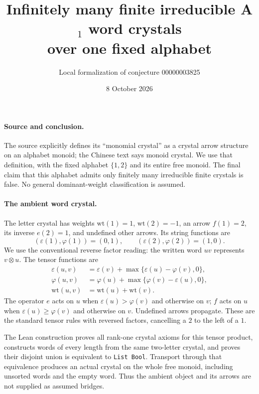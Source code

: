 \documentclass[11pt]{article}
\title{Infinitely many finite irreducible A\texorpdfstring{$_1$}{1} word crystals\\over one fixed alphabet}
\author{Local formalization of conjecture 00000003825}
\date{8 October 2026}
\begin{document}
\maketitle
\vspace{-12mm}
\paragraph{Source and conclusion.}
The source explicitly defines its ``monomial crystal'' as a crystal arrow structure on an alphabet monoid; the Chinese text says monoid crystal. We use that definition, with the fixed alphabet $\{1,2\}$ and its entire free monoid. The final claim that this alphabet admits only finitely many irreducible finite crystals is false. No general dominant-weight classification is assumed.

\paragraph{The ambient word crystal.}
The letter crystal has weights $\mathrm{wt}(1)=1$, $\mathrm{wt}(2)=-1$, an arrow $f(1)=2$, its inverse $e(2)=1$, and undefined other arrows. Its string functions are
\[
(\varepsilon(1),\varphi(1))=(0,1),\qquad
(\varepsilon(2),\varphi(2))=(1,0).
\]
We use the conventional reverse factor reading: the written word $uv$ represents $v\otimes u$. The tensor functions are
\begin{align*}
\varepsilon(u,v)&=\varepsilon(v)+\max\{\varepsilon(u)-\varphi(v),0\},\\
\varphi(u,v)&=\varphi(u)+\max\{\varphi(v)-\varepsilon(u),0\},\\
\mathrm{wt}(u,v)&=\mathrm{wt}(u)+\mathrm{wt}(v).
\end{align*}
The operator $e$ acts on $u$ when $\varepsilon(u)>\varphi(v)$ and otherwise on $v$; $f$ acts on $u$ when $\varepsilon(u)\geq\varphi(v)$ and otherwise on $v$. Undefined arrows propagate. These are the standard tensor rules with reversed factors, cancelling a $2$ to the left of a $1$.

The Lean construction proves all rank-one crystal axioms for this tensor product, constructs words of every length from the same two-letter crystal, and proves their disjoint union is equivalent to \texttt{List Bool}. Transport through that equivalence produces an actual crystal on the whole free monoid, including unsorted words and the empty word. Thus the ambient object and its arrows are not supplied as assumed bridges.
\end{document}
